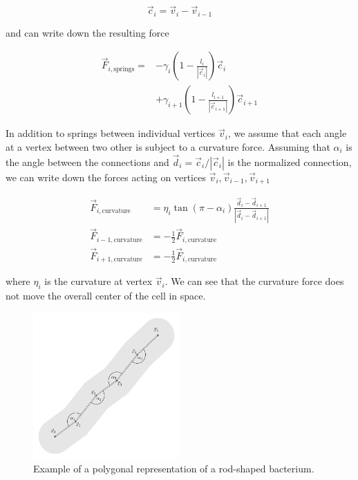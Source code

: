 \documentclass{article}
\begin{document}
\begin{equation}
    \vec{c}_i = \vec{v}_{i}-\vec{v}_{i-1}
\end{equation}

and can write down the resulting force

\begin{align}
    \vec{F}_{i,\text{springs}} =
        &-\gamma_i\left(1 - \frac{l_i}{\left|\vec{c}_i\right|}\right)\vec{c}_i\\
        &+ \gamma_{i+1}\left(1 - \frac{l_{i+1}}{\left|\vec{c}_{i+1}\right|}\right)\vec{c}_{i+1}
    \label{force-springs}
\end{align}

In addition to springs between individual vertices $\vec{v}_i$, we assume that each angle at
a vertex between two other is subject to a curvature force.
Assuming that $\alpha_i$ is the angle between the connections and
$\vec{d}_i=\vec{c}_i/|\vec{c}_i|$ is the normalized connection,
we can write down the forces acting on vertices $\vec{v}_i,\vec{v}_{i-1},\vec{v}_{i+1}$

\begin{align}
    \vec{F}_{i,\text{curvature}} &= \eta_i\tan\left(\pi-\alpha_i\right)
        \frac{\vec{d}_i - \vec{d}_{i+1}}{|\vec{d}_i-\vec{d}_{i+1}|}\\
    \vec{F}_{i-1,\text{curvature}} &= -\frac{1}{2}\vec{F}_{i,\text{curvature}}\\
    \vec{F}_{i+1,\text{curvature}} &= -\frac{1}{2}\vec{F}_{i,\text{curvature}}
    \label{force-curvature}
\end{align}

where $\eta_i$ is the curvature at vertex $\vec{v}_i$.
We can see that the curvature force does not move the overall center of the cell in space.

\begin{figure}
    \centering
    \includegraphics[width=0.5\textwidth]
        {../docs/source/_static/mechanics.png}
    \caption{Example of a polygonal representation of a rod-shaped bacterium.}
    \label{fig:mechanics-bacterium}
\end{figure}
\end{document}

